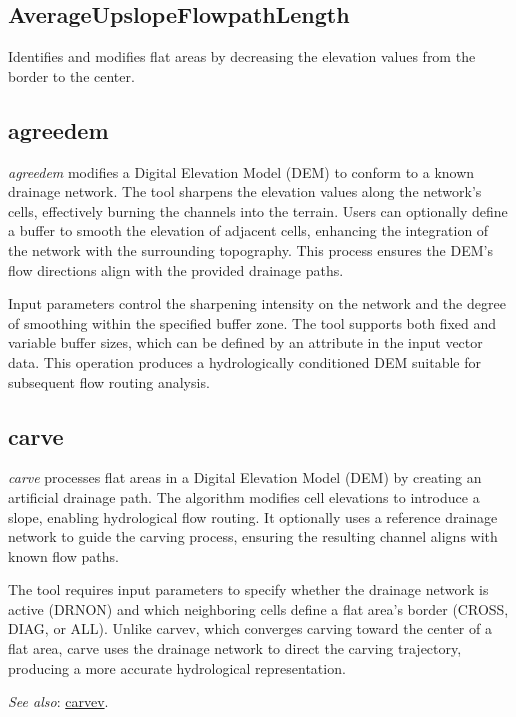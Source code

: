 \documentclass[
]{book}
\theoremstyle{definition}
\theoremstyle{definition}
\theoremstyle{definition}
\theoremstyle{definition}
\theoremstyle{remark}
\begin{document}
\subsection{AverageUpslopeFlowpathLength}\label{AverageUpslopeFlowpathLength}

Identifies and modifies flat areas by decreasing the elevation values from the border to the center.

\subsection{agreedem}\label{agreedem}

\emph{agreedem} modifies a Digital Elevation Model (DEM) to conform to a known drainage network. The tool sharpens the elevation values along the network's cells, effectively burning the channels into the terrain. Users can optionally define a buffer to smooth the elevation of adjacent cells, enhancing the integration of the network with the surrounding topography. This process ensures the DEM's flow directions align with the provided drainage paths.

Input parameters control the sharpening intensity on the network and the degree of smoothing within the specified buffer zone. The tool supports both fixed and variable buffer sizes, which can be defined by an attribute in the input vector data. This operation produces a hydrologically conditioned DEM suitable for subsequent flow routing analysis.

\subsection{carve}\label{carve}

\emph{carve} processes flat areas in a Digital Elevation Model (DEM) by creating an artificial drainage path. The algorithm modifies cell elevations to introduce a slope, enabling hydrological flow routing. It optionally uses a reference drainage network to guide the carving process, ensuring the resulting channel aligns with known flow paths.

The tool requires input parameters to specify whether the drainage network is active (DRNON) and which neighboring cells define a flat area's border (CROSS, DIAG, or ALL). Unlike carvev, which converges carving toward the center of a flat area, carve uses the drainage network to direct the carving trajectory, producing a more accurate hydrological representation.

\emph{See also}: \hyperref[carvev]{carvev}.
\end{document}

